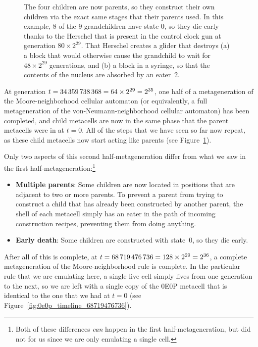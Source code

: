 \begin{figure}[!htb]
	\centering
	\caption{The four children are now parents, so they construct their own children via the exact same stages that their parents used. In this example, $8$ of the $9$ grandchildren have state $0$, so they die early thanks to the Herschel that is present in the control clock gun at generation $80 \times 2^{29}$. That Herschel creates a glider that destroys (a) a block that would otherwise cause the grandchild to wait for $48 \times 2^{29}$ generations, and (b) a block in a syringe, so that the contents of the nucleus are absorbed by an eater~2.}
	\label{fig:0e0p_timeline_34359738368}
\end{figure}

At generation $t = 34{\,}359{\,}738{\,}368 = 64 \times 2^{29} = 2^{35}$, one half of a metageneration of the Moore-neighborhood cellular automaton (or equivalently, a full metageneration of the von-Neumann-neighborhood cellular automaton) has been completed, and child metacells are now in the same phase that the parent metacells were in at $t = 0$. All of the steps that we have seen so far now repeat, as these child metacells now start acting like parents (see Figure~\ref{fig:0e0p_timeline_34359738368}).

Only two aspects of this second half-metageneration differ from what we saw in the first half-metageneration:\footnote{Both of these differences \emph{can} happen in the first half-metageneration, but did not for us since we are only emulating a single cell.}\smallskip

\begin{itemize}
	\item \textbf{Multiple parents}: Some children are now located in positions that are adjacent to two or more parents. To prevent a parent from trying to construct a child that has already been constructed by another parent, the shell of each metacell simply has an eater in the path of incoming construction recipes, preventing them from doing anything.\smallskip
	
	\item \textbf{Early death}: Some children are constructed with state~$0$, so they die early.\smallskip
\end{itemize}

After all of this is complete, at $t = 68{\,}719{\,}476{\,}736 = 128 \times 2^{29} = 2^{36}$, a complete metageneration of the Moore-neighborhood rule is complete. In the particular rule that we are emulating here, a single live cell simply lives from one generation to the next, so we are left with a single copy of the 0E0P metacell that is identical to the one that we had at $t = 0$ (see Figure~\ref{fig:0e0p_timeline_68719476736}).

